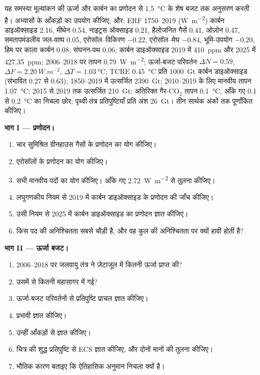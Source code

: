 \begin{problem}\label{pb:b2:anthropogenic-climate-change:1}
यह समस्या मूल्यांकन की ऊर्जा और कार्बन का प्रणोदन से \qty{1.5}{\celsius} के शेष बजट तक
अनुसरण करती है। अभ्यासों के आँकड़ों का उपयोग कीजिए, और: ERF 1750--2019 (\unit{W.m^{-2}})
कार्बन डाइऑक्साइड 2.16, मीथेन 0.54, नाइट्रस ऑक्साइड 0.21, हैलोजनित गैसें 0.41, ओज़ोन 0.47,
समतापमंडलीय जल-वाष्प 0.05, एरोसॉल--विकिरण $-0.22$, एरोसॉल--मेघ $-0.84$, भूमि-उपयोग
$-0.20$, हिम पर काला कार्बन 0.08, संघनन-पथ 0.06; कार्बन डाइऑक्साइड 2019 में \qty{410}{ppm} और
2025 में \qty{427.35}{ppm}; 2006--2018 पर तापन \qty{0.79}{W.m^{-2}}; ऊर्जा-बजट परिवर्तन
$\Delta N = 0.59$, $\Delta F = \qty{2.20}{W.m^{-2}}$, $\Delta T = \qty{1.03}{\celsius}$; TCRE
\qty{0.45}{\celsius} प्रति \qty{1000}{Gt} कार्बन डाइऑक्साइड (संभावित 0.27 से 0.63); 1850--2019 में उत्सर्जित
\qty{2390}{Gt}; 2010--2019 के लिए मानवीय तापन \qty{1.07}{\celsius}; 2015 से 2019 तक उत्सर्जित
\qty{210}{Gt}; अतिरिक्त गैर-CO$_2$ तापन \qty{0.1}{\celsius}, आँके गए 0.1
से \qty{0.2}{\celsius} का निचला छोर; पृथ्वी-तंत्र प्रतिपुष्टियाँ प्रति अंश \qty{26}{Gt}। तीन सार्थक
अंकों तक पूर्णांकित कीजिए।

\noindent\textbf{भाग I --- प्रणोदन।}
\begin{enumerate}
  \item चार सुमिश्रित ग्रीनहाउस गैसों के प्रणोदन का योग कीजिए।
  \item एरोसॉलों के प्रणोदन का योग कीजिए।
  \item सभी मानवीय पदों का योग कीजिए। आँके गए \qty{2.72}{W.m^{-2}} से तुलना कीजिए।
  \item लघुगणकीय नियम से 2019 में कार्बन डाइऑक्साइड के प्रणोदन की जाँच कीजिए।
  \item उसी नियम से 2025 में कार्बन डाइऑक्साइड का प्रणोदन ज्ञात कीजिए।
  \item किस पद की अनिश्चितता सबसे चौड़ी है, और वह कुल की अनिश्चितता पर क्यों हावी होती है?
\end{enumerate}

\noindent\textbf{भाग II --- ऊर्जा बजट।}
\begin{enumerate}[resume]
  \item 2006--2018 पर जलवायु तंत्र ने ज़ेटाजूल में कितनी ऊर्जा प्राप्त की?
  \item उसमें से कितनी महासागर में गई?
  \item ऊर्जा-बजट परिवर्तनों से प्रतिपुष्टि प्राचल ज्ञात कीजिए।
  \item प्रभावी  ज्ञात कीजिए।
  \item उन्हीं आँकड़ों से  ज्ञात कीजिए।
  \item चित्र की शुद्ध प्रतिपुष्टि से ECS ज्ञात कीजिए, और दोनों मानों की तुलना कीजिए।
  \item भौतिक कारण बताइए कि ऐतिहासिक अनुमान निचला क्यों है।
\end{enumerate}


\end{problem}

